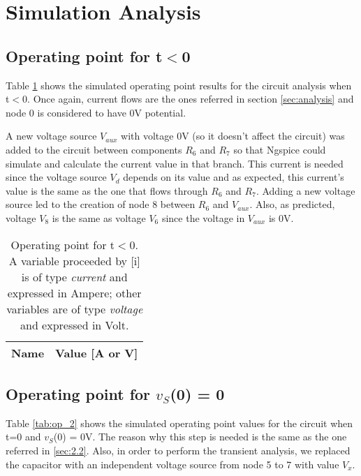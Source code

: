 \section{Simulation Analysis}
\label{sec:simulation}

\subsection{Operating point for t$<$0}

Table \ref{tab:op_1} shows the simulated operating point results for the circuit analysis when t$<$0. Once again, current flows are the ones referred in section \ref{sec:analysis} and node 0 is considered to have 0V potential. \par
 A new voltage source $V_{aux}$ with voltage 0V (so it doesn't affect the circuit) was added to the circuit between components $R_6$ and $R_7$ so that Ngspice could simulate and calculate the current value in that branch. This current is needed since the voltage source $V_d$ depends on its value and as expected, this current's value is the same as the one that flows through $R_6$ and $R_7$. Adding a new voltage source led to the creation of node 8 between $R_6$ and $V_{aux}$. Also, as predicted, voltage $V_8$ is the same as voltage $V_6$ since the voltage in $V_{aux}$ is 0V.

\begin{table}[h]
  \centering
  \begin{tabular}{|l|r|}
    \hline    
    {\bf Name} & {\bf Value [A or V]} \\ \hline
    
  \end{tabular}
  \caption{Operating point for t$<$0. A variable proceeded by [i] is of type {\em current}
    and expressed in Ampere; other variables are of type {\it voltage} and expressed in
    Volt.}
  \label{tab:op_1}
\end{table}
\FloatBarrier

\subsection{Operating point for $v_S$(0) = 0}

Table \ref{tab:op_2} shows the simulated operating point values for the circuit when t=0 and $v_S$(0) = 0V. The reason why this step is needed is the same as the one referred in \ref{sec:2.2}. Also, in order to perform the transient analysis, we replaced the capacitor with an independent voltage source from node 5 to 7 with value $V_x$. 


